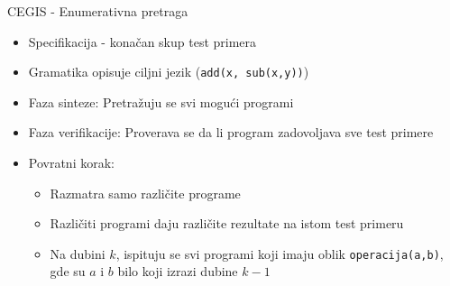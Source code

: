 \begin{frame}{CEGIS - Enumerativna pretraga}
    \begin{itemize}
        \item Specifikacija - konačan skup test primera
        \item Gramatika opisuje ciljni jezik (\texttt{add(x, sub(x,y))})
        \item Faza sinteze: Pretražuju se svi mogući programi
        \item Faza verifikacije: Proverava se da li program zadovoljava sve test primere
        \item Povratni korak: 
        \begin{itemize}
        	\item Razmatra samo različite programe
        	\item Različiti programi daju različite rezultate na istom test primeru
        	\item Na dubini $k$, ispituju se svi programi koji imaju oblik \texttt{operacija(a,b)}, gde su $a$ i $b$ bilo koji izrazi dubine $k-1$
        \end{itemize}
    \end{itemize}
\end{frame}
